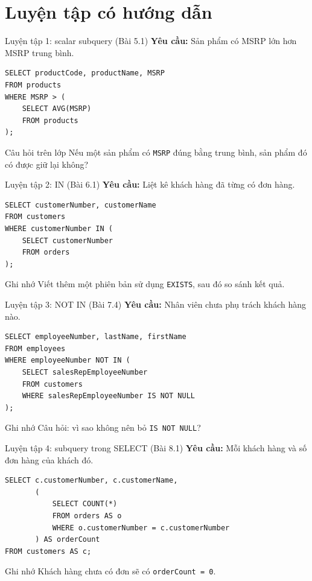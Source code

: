 \documentclass[aspectratio=169,10pt]{beamer}
\newcommand{\code}[1]{\texttt{#1}}
\begin{document}
\section{Luyện tập có hướng dẫn}

\begin{frame}[fragile]{Luyện tập 1: scalar subquery (Bài 5.1)}
\textbf{Yêu cầu:} Sản phẩm có MSRP lớn hơn MSRP trung bình.\vspace{.2em}\begin{lstlisting}
SELECT productCode, productName, MSRP
FROM products
WHERE MSRP > (
    SELECT AVG(MSRP)
    FROM products
);
\end{lstlisting}
\begin{block}{Câu hỏi trên lớp}
Nếu một sản phẩm có \code{MSRP} đúng bằng trung bình, sản phẩm đó có được giữ lại không?
\end{block}
\end{frame}

\begin{frame}[fragile]{Luyện tập 2: IN (Bài 6.1)}
\textbf{Yêu cầu:} Liệt kê khách hàng đã từng có đơn hàng.\vspace{.2em}\begin{lstlisting}
SELECT customerNumber, customerName
FROM customers
WHERE customerNumber IN (
    SELECT customerNumber
    FROM orders
);
\end{lstlisting}
\begin{block}{Ghi nhớ}
\small Viết thêm một phiên bản sử dụng \code{EXISTS}, sau đó so sánh kết quả.
\end{block}
\end{frame}

\begin{frame}[fragile]{Luyện tập 3: NOT IN (Bài 7.4)}
\textbf{Yêu cầu:} Nhân viên chưa phụ trách khách hàng nào.\vspace{.2em}\begin{lstlisting}
SELECT employeeNumber, lastName, firstName
FROM employees
WHERE employeeNumber NOT IN (
    SELECT salesRepEmployeeNumber
    FROM customers
    WHERE salesRepEmployeeNumber IS NOT NULL
);
\end{lstlisting}
\begin{block}{Ghi nhớ}
\small Câu hỏi: vì sao không nên bỏ \code{IS NOT NULL}?
\end{block}
\end{frame}

\begin{frame}[fragile]{Luyện tập 4: subquery trong SELECT (Bài 8.1)}
\textbf{Yêu cầu:} Mỗi khách hàng và số đơn hàng của khách đó.\vspace{.2em}\begin{lstlisting}
SELECT c.customerNumber, c.customerName,
       (
           SELECT COUNT(*)
           FROM orders AS o
           WHERE o.customerNumber = c.customerNumber
       ) AS orderCount
FROM customers AS c;
\end{lstlisting}
\begin{block}{Ghi nhớ}
\small Khách hàng chưa có đơn sẽ có \code{orderCount = 0}.
\end{block}
\end{frame}
\end{document}
